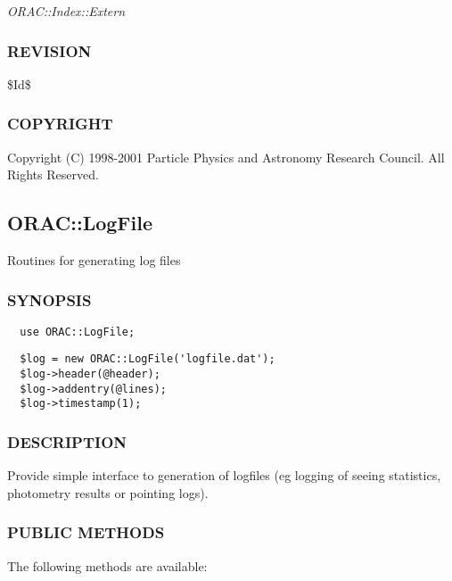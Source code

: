 \emph{ORAC::Index::Extern}

\subsubsection*{REVISION\label{ORAC::Index_REVISION}}


\$Id\$

\subsubsection*{COPYRIGHT\label{ORAC::Index_COPYRIGHT}}


Copyright (C) 1998-2001 Particle Physics and Astronomy Research
Council. All Rights Reserved.

\subsection{ORAC::LogFile\label{ORAC::LogFile}}


Routines for generating log files

\subsubsection*{SYNOPSIS\label{ORAC::LogFile_SYNOPSIS}}
\begin{verbatim}
  use ORAC::LogFile;
\end{verbatim}
\begin{verbatim}
  $log = new ORAC::LogFile('logfile.dat');
  $log->header(@header);
  $log->addentry(@lines);
  $log->timestamp(1);
\end{verbatim}
\subsubsection*{DESCRIPTION\label{ORAC::LogFile_DESCRIPTION}}


Provide simple interface to generation of logfiles (eg logging
of seeing statistics, photometry results or pointing logs).

\subsubsection*{PUBLIC METHODS\label{ORAC::LogFile_PUBLIC_METHODS}}


The following methods are available:

